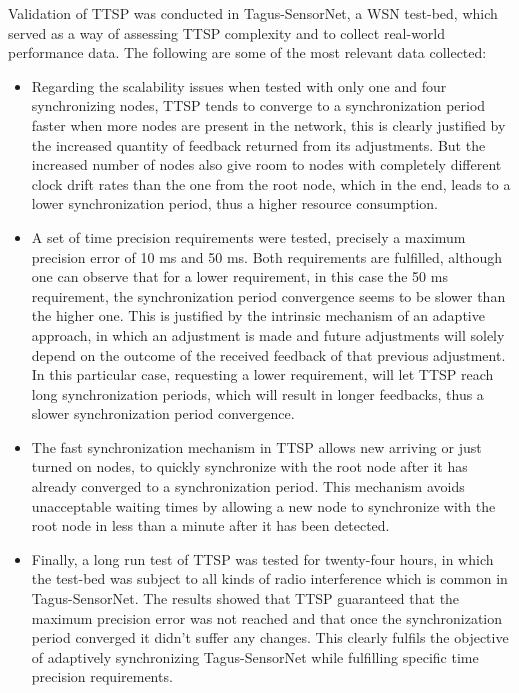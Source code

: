 Validation of TTSP was conducted in Tagus-SensorNet, a WSN test-bed, which served as a way of assessing TTSP complexity and to collect real-world performance data. The following are some of the most relevant data collected:
\begin{itemize}
\item Regarding the scalability issues when tested with only one and four synchronizing nodes, TTSP tends to converge to a synchronization period faster when more nodes are present in the network, this is clearly justified by the increased quantity of feedback returned from its adjustments. But the increased number of nodes also give room to nodes with completely different clock drift rates than the one from the root node, which in the end, leads to a lower synchronization period, thus a higher resource consumption.
\item A set of time precision requirements were tested, precisely a maximum precision error of 10 ms and 50 ms. Both requirements are fulfilled, although one can observe that for a lower requirement, in this case the 50 ms requirement, the synchronization period convergence seems to be slower than the higher one. This is justified by the intrinsic mechanism of an adaptive approach, in which an adjustment is made and future adjustments will solely depend on the outcome of the received feedback of that previous adjustment. In this particular case, requesting a lower requirement, will let TTSP reach long synchronization periods, which will result in longer feedbacks, thus a slower synchronization period convergence.
\item The fast synchronization mechanism in TTSP allows new arriving or just turned on nodes, to quickly synchronize with the root node after it has already converged to a synchronization period. This mechanism avoids unacceptable waiting times by allowing a new node to synchronize with the root node in less than a minute after it has been detected.
\item Finally, a long run test of TTSP was tested for twenty-four hours, in which the test-bed was subject to all kinds of radio interference which is common in Tagus-SensorNet. The results showed that TTSP guaranteed that the maximum precision error was not reached and that once the synchronization period converged it didn't suffer any changes. This clearly fulfils the objective of adaptively synchronizing Tagus-SensorNet while fulfilling specific time precision requirements.
\end{itemize}


